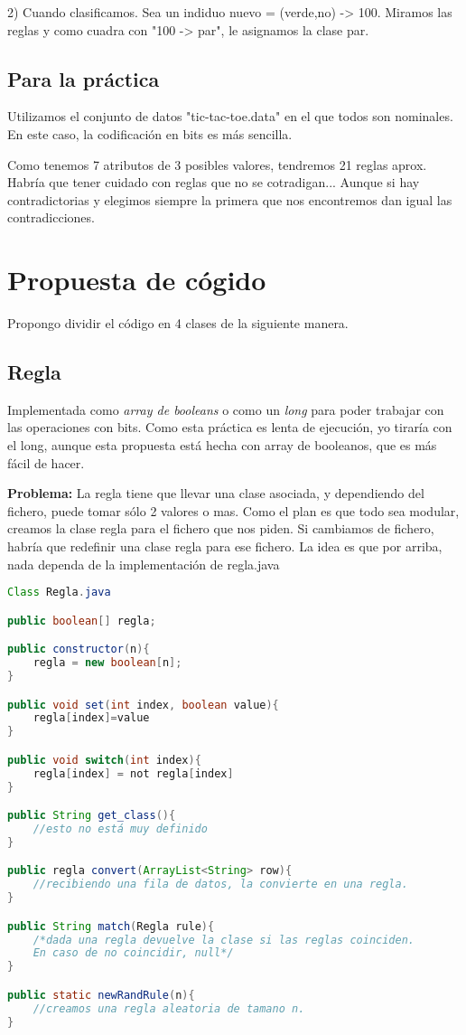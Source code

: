\documentclass[nochap]{apuntes}
\begin{document}
2) Cuando clasificamos. Sea un indiduo nuevo = (verde,no) -> 100. Miramos las reglas y como cuadra con "100 -> par", le asignamos la clase par.


\subsection{Para la práctica}

Utilizamos el conjunto de datos "tic-tac-toe.data" en el que todos son nominales. En este caso, la codificación en bits es más sencilla.

Como tenemos 7 atributos de 3 posibles valores, tendremos 21 reglas aprox. Habría que tener cuidado con reglas que no se cotradigan... Aunque si hay contradictorias y elegimos siempre la primera que nos encontremos dan igual las contradicciones.



\section{Propuesta de cógido}

Propongo dividir el código en 4 clases de la siguiente manera.

\subsection{Regla}
Implementada como \textit{array de booleans} o como un \textit{long} para poder trabajar con las operaciones con bits. Como esta práctica es lenta de ejecución, yo tiraría con el long, aunque esta propuesta está hecha con array de booleanos, que es más fácil de hacer.

\textbf{Problema:} La regla tiene que llevar una clase asociada, y dependiendo del fichero, puede tomar sólo 2 valores o mas. Como el plan es que todo sea modular, creamos la clase regla para el fichero que nos piden. Si cambiamos de fichero, habría que redefinir una clase regla para ese fichero. La idea es que por arriba, nada dependa de la implementación de regla.java

\begin{lstlisting}[language=Java]
Class Regla.java

public boolean[] regla;

public constructor(n){
	regla = new boolean[n];
}

public void set(int index, boolean value){
	regla[index]=value
}

public void switch(int index){
	regla[index] = not regla[index]
}

public String get_class(){
	//esto no está muy definido
}

public regla convert(ArrayList<String> row){
	//recibiendo una fila de datos, la convierte en una regla.
}

public String match(Regla rule){
	/*dada una regla devuelve la clase si las reglas coinciden.
	En caso de no coincidir, null*/
}

public static newRandRule(n){
	//creamos una regla aleatoria de tamano n.
}
\end{lstlisting}
\end{document}
